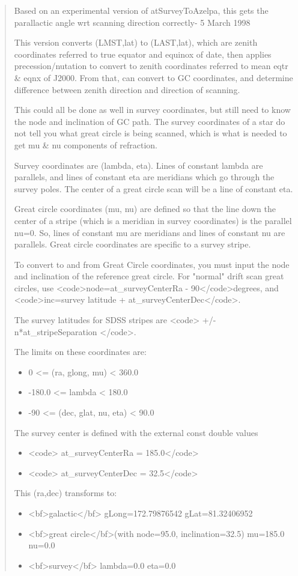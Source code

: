 \begin{quote}
 Based on an experimental version of atSurveyToAzelpa, this gets the 
     parallactic angle wrt scanning direction  correctly- 5 March 1998

   This version converts (LMST,lat) to (LAST,lat), which are zenith
    coordinates referred to true equator and equinox of date, then 
    applies precession/nutation to convert to zenith coordinates referred 
    to mean eqtr & eqnx of J2000.  From that, can convert to GC coordinates, 
    and determine difference between zenith direction and direction of 
    scanning.

    This could all be done as well in survey coordinates, but still need
    to know the node and inclination of GC path.  The survey coordinates
    of a star do not tell you what great circle is being scanned, which
    is what is needed to get mu & nu components of refraction.

   Survey coordinates are (lambda, eta).  Lines of constant lambda are
   parallels, and lines of constant eta are meridians which go through
   the survey poles.  The center of a great circle scan will be a line
   of constant eta.

   Great circle coordinates (mu, nu) are defined so that the line down the
   center of a stripe (which is a meridian in survey coordinates) is the
   parallel nu=0.  So, lines of constant mu are meridians and lines of
   constant nu are parallels.  Great circle coordinates are specific to a
   survey stripe.

   To convert to and from Great Circle coordinates, you must input the
   node and inclination of the reference great circle.  For "normal" drift
   scan great circles, use <code>node=at_surveyCenterRa - 90</code>degrees,
   and <code>inc=survey latitude + at_surveyCenterDec</code>.

   The survey latitudes for SDSS stripes are <code> +/- n*at_stripeSeparation
   </code>.


   The limits on these coordinates are:
\begin{itemize}
\item 0 <= (ra, glong, mu) < 360.0
\item -180.0 <= lambda < 180.0
\item -90 <= (dec, glat, nu, eta) < 90.0
\end{itemize}

   The survey center is defined with the external const double values
\begin{itemize}
\item <code> at_surveyCenterRa = 185.0</code>
\item <code> at_surveyCenterDec = 32.5</code>
\end{itemize}
   This (ra,dec) transforms to:
\begin{itemize}
\item <bf>galactic</bf> gLong=172.79876542 gLat=81.32406952
\item <bf>great circle</bf>(with node=95.0, inclination=32.5) mu=185.0 nu=0.0
\item <bf>survey</bf> lambda=0.0 eta=0.0
\end{itemize}
\end{quote}

